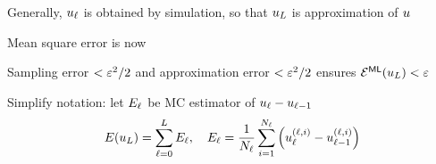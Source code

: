 \begin{frame}{\name{}}
    \begin{overlayarea}{\textwidth}{\frameheight}
        \vspace{2em}%
        \begin{squarelist}
            \item<1-> Generally, $u_\ell$ is obtained by simulation, so that $u_L$ is approximation of $u$
            \item<2-> Mean square error is now
            \item<6-> Sampling error $< \varepsilon^2/2$ and approximation error $< \varepsilon^2/2$ ensures $\mathcal{E}^{\mathsf{ML}}(u_L) < \varepsilon$
            \item<7-> Simplify notation: let $E_\ell$ be MC estimator of $u_\ell - u_{\ell-1}$
                \begin{equation*}
                    E(u_L) = \sum_{\ell = 0}^L E_\ell, \quad E_\ell = \frac{1}{N_\ell}\sum_{i=1}^{N_\ell}\left(u_\ell^{(\ell,i)} - u_{\ell-1}^{(\ell,i)}\right)
                \end{equation*}
        \end{squarelist}
    \end{overlayarea}
\end{frame}

